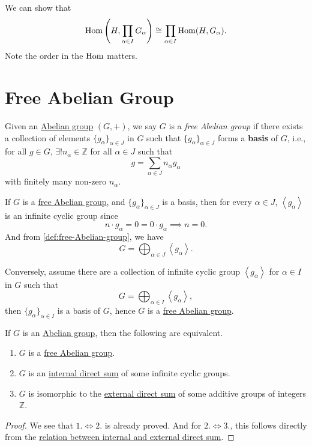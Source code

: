 \begin{exercise}
	We can show that
	\[
		\operatorname{Hom} \left(H, \prod\limits_{\alpha \in I}G_\alpha\right) \cong \prod\limits_{\alpha \in I}\operatorname{Hom} (H, G_\alpha).
	\]
	Note the order in the \(\operatorname{Hom} \) matters.
\end{exercise}

\section{Free Abelian Group}
\begin{definition}\label{def:free-Abelian-group}
	Given an  \hyperref[def:Abelian-group]{Abelian group} \((G, +)\), we say \(G\) is a \emph{free Abelian group} if there exists a collection of elements \(\{g_\alpha \}_{\alpha \in J}\) in \(G\) such that
	\(\{g_\alpha \}_{\alpha \in J}\) forms a \textbf{basis} of \(G\), i.e., for all \(g\in G\), \(\exists ! n _\alpha \in \mathbb{Z} \) for all \(\alpha \in J\) such that
	\[
		g = \sum\limits_{\alpha \in J} n_\alpha g_\alpha
	\]
	with finitely many non-zero \(n_\alpha\).
\end{definition}
\begin{remark}
	If \(G\) is a \hyperref[def:free-Abelian-group]{free Abelian group}, and \(\{g_\alpha \}_{\alpha \in J}\) is a basis, then for every \(\alpha \in J\), \(\left< g_\alpha \right> \) is an
	infinite cyclic group since
	\[
		n\cdot g_\alpha = 0 = 0\cdot g_\alpha \implies n = 0.
	\]
	And from \autoref{def:free-Abelian-group}, we have
	\[
		G = \bigoplus_{\alpha \in J}\left< g_\alpha  \right>.
	\]

	Conversely, assume there are a collection of infinite cyclic group \(\left< g_\alpha  \right> \) for \(\alpha \in I\) in \(G\) such that
	\[
		G = \bigoplus_{\alpha \in I}\left< g_\alpha  \right>,
	\]
	then \(\{g_\alpha \}_{\alpha \in I}\) is a basis of \(G\), hence \(G\) is a \hyperref[def:free-Abelian-group]{free Abelian group}.
\end{remark}

\begin{proposition}
	If \(G\) is an  \hyperref[def:Abelian-group]{Abelian group}, then the following are equivalent.
	\begin{enumerate}[(1)]
		\item \(G\) is a \hyperref[def:free-Abelian-group]{free Abelian group}.
		\item \(G\) is an \hyperref[def:internal-direct-sum]{internal direct sum} of some infinite cyclic groups.
		\item \(G\) is isomorphic to the \hyperref[def:external-direct-sum]{external direct sum} of some additive groups of integers \(\mathbb{Z} \).
	\end{enumerate}
\end{proposition}
\begin{proof}
	We see that \(1. \iff 2.\) is already proved. And for \(2. \iff 3.\), this follows directly from the \hyperref[rmk:relation-between-internal-and-externam-direct-sum]{relation between internal and external direct sum}.
\end{proof}

